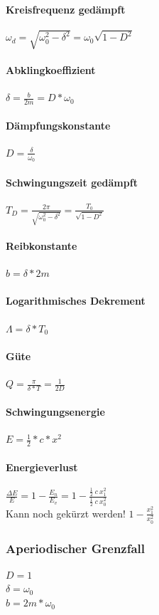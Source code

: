 \documentclass[12pt, a4paper]{scrreprt}
\begin{document}
\paragraph{Kreisfrequenz gedämpft} \dotfill \(\omega_d=\sqrt{\omega_0^2-\delta^2}=\omega_0\sqrt{1-D^2}\)
\paragraph{Abklingkoeffizient} \dotfill \(\delta=\frac{b}{2m}=D*\omega_0\)
\paragraph{Dämpfungskonstante} \dotfill \(D=\frac{\delta}{\omega_0}\)
\paragraph{Schwingungszeit gedämpft} \dotfill \(T_D=\frac{2\pi}{\sqrt{\omega_0^2-\delta^2}}=\frac{T_0}{\sqrt{1-D^2}}\)
\paragraph{Reibkonstante} \dotfill \(b=\delta * 2m\)
\paragraph{Logarithmisches Dekrement} \dotfill \(\Lambda=\delta*T_0\)
\paragraph{Güte} \dotfill \(Q=\frac{\pi}{\delta*T}=\frac{1}{2D}\)
\paragraph{Schwingungsenergie} \dotfill \(E = \frac{1}{2}*c*x^2\)
\paragraph{Energieverlust} \dotfill
\(\frac{\Delta E}{E} = 1-\frac{E_n}{E_v}=1-\frac{\frac{1}{2}\ c\ x_1^2}{\frac{1}{2}\ c\ x_0^2}\)\\
\-\hspace{1.5cm}Kann noch gekürzt werden! \dotfill \(1-\frac{x_1^2}{x_0^2}\)

\subsubsection{Aperiodischer Grenzfall}
\(D=1\)\\
\(\delta=\omega_0\)\\
\(b=2m*\omega_0\)
\end{document}
